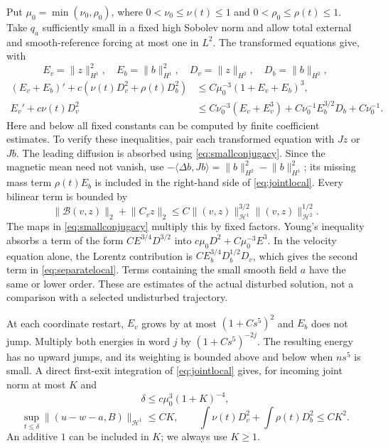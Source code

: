 \documentclass[11pt,a4paper]{amsart}
\theoremstyle{definition}
\theoremstyle{remark}
\numberwithin{equation}{section}
\newcommand{\Bcal}{\mathcal B}
\newcommand{\Hcal}{\mathcal H}
\newcommand{\ip}[2]{\langle #1,#2\rangle}
\newcommand{\norm}[1]{\lVert #1\rVert}
\begin{document}
Put $\mu_0=\min(\nu_0,\rho_0)$, where $0<\nu_0\le\nu(t)\le1$ and $0<\rho_0\le\rho(t)\le1$. Take $q_a$ sufficiently small in a fixed high Sobolev norm and allow total external and smooth-reference forcing at most one in $L^2$. The transformed equations give, with
\[
 E_v=\norm z_{H^1}^2,\quad E_b=\norm b_{H^1}^2,\quad
 D_v=\norm z_{H^2},\quad D_b=\norm b_{H^2},
\]
\begin{align}\label{eq:jointlocal}
 (E_v+E_b)' +c(\nu(t)D_v^2+\rho(t)D_b^2)
 &\le C\mu_0^{-3}(1+E_v+E_b)^3,\\
 E_v'+c\nu(t)D_v^2
 &\le C\nu_0^{-3}(E_v+E_v^3)
       +C\nu_0^{-1}E_b^{3/2}D_b+C\nu_0^{-1}.
 \label{eq:separatelocal}
\end{align}
Here and below all fixed constants can be computed by finite coefficient estimates. To verify these inequalities, pair each transformed equation with $Jz$ or $Jb$. The leading diffusion is absorbed using \eqref{eq:smallconjugacy}. Since the magnetic mean need not vanish, use $-\ip{\Delta b}{Jb}=\norm b_{H^2}^2-\norm b_{H^1}^2$; its missing mass term $\rho(t)E_b$ is included in the right-hand side of \eqref{eq:jointlocal}. Every bilinear term is bounded by
\begin{equation}\label{eq:Agmontame}
 \norm{\Bcal(v,z)}_2+\norm{C_vz}_2
 \le C\norm{(v,z)}_{\Hcal^1}^{3/2}
          \norm{(v,z)}_{\Hcal^2}^{1/2}.
\end{equation}
The maps in \eqref{eq:smallconjugacy} multiply this by fixed factors. Young's inequality absorbs a term of the form $CE^{3/4}D^{3/2}$ into $c\mu_0D^2+C\mu_0^{-3}E^3$. In the velocity equation alone, the Lorentz contribution is
$C E_b^{3/4}D_b^{1/2}D_v$, which gives the second term in \eqref{eq:separatelocal}. Terms containing the small smooth field $a$ have the same or lower order. These are estimates of the actual disturbed solution, not a comparison with a selected undisturbed trajectory.

At each coordinate restart, $E_v$ grows by at most $(1+Cs^5)^2$ and $E_b$ does not jump. Multiply both energies in word $j$ by $(1+Cs^5)^{-2j}$. The resulting energy has no upward jumps, and its weighting is bounded above and below when $ns^5$ is small. A direct first-exit integration of \eqref{eq:jointlocal} gives, for incoming joint norm at most $K$ and
\begin{equation}\label{eq:localtimecap}
 \delta\le c\mu_0^3(1+K)^{-4},
\end{equation}
\begin{equation}\label{eq:localH1H2}
 \sup_{t\le\delta}\norm{(u-w-a,B)}_{\Hcal^1}\le CK,
 \qquad
 \int\nu(t)D_v^2+\int\rho(t)D_b^2\le CK^2.
\end{equation}
An additive $1$ can be included in $K$; we always use $K\ge1$.
\end{document}
